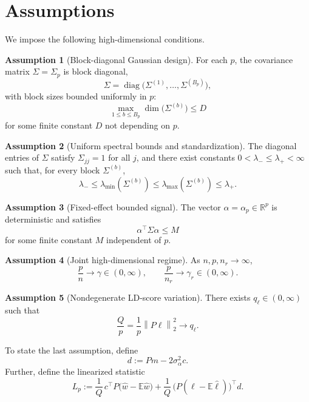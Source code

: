 \documentclass[11pt]{article}
\theoremstyle{definition}
\newtheorem{assumption}{Assumption}
\newcommand{\R}{\mathbb{R}}
\newcommand{\E}{\mathbb{E}}
\newcommand{\diag}{\operatorname{diag}}
\newcommand{\1}{\mathbf{1}}
\newcommand{\norm}[1]{\left\lVert #1 \right\rVert}
\begin{document}
\section*{Assumptions}

We impose the following high-dimensional conditions.

\begin{assumption}[Block-diagonal Gaussian design]\label{ass:block}
For each $p$, the covariance matrix $\Sigma=\Sigma_p$ is block diagonal,
\[
 \Sigma=\diag\bigl(\Sigma^{(1)},\dots,\Sigma^{(B_p)}\bigr),
\]
with block sizes bounded uniformly in $p$:
\[
 \max_{1\le b\le B_p}\dim\bigl(\Sigma^{(b)}\bigr)\le D
\]
for some finite constant $D$ not depending on $p$.
\end{assumption}

\begin{assumption}[Uniform spectral bounds and standardization]\label{ass:spectral}
The diagonal entries of $\Sigma$ satisfy $\Sigma_{jj}=1$ for all $j$, and there exist constants $0<\lambda_-\le \lambda_+<\infty$ such that, for every block $\Sigma^{(b)}$,
\[
 \lambda_-\le \lambda_{\min}(\Sigma^{(b)})\le \lambda_{\max}(\Sigma^{(b)})\le \lambda_+.
\]
\end{assumption}

\begin{assumption}[Fixed-effect bounded signal]\label{ass:alpha}
The vector $\alpha=\alpha_p\in\R^p$ is deterministic and satisfies
\[
 \alpha^\top\Sigma\alpha\le M
\]
for some finite constant $M$ independent of $p$.
\end{assumption}

\begin{assumption}[Joint high-dimensional regime]\label{ass:asymptotics}
As $n,p,n_r\to\infty$,
\[
 \frac{p}{n}\to \gamma\in(0,\infty),
 \qquad
 \frac{p}{n_r}\to \gamma_r\in(0,\infty).
\]
\end{assumption}

\begin{assumption}[Nondegenerate LD-score variation]\label{ass:Q}
There exists $q_\ell\in(0,\infty)$ such that
\[
 \frac{Q}{p}=\frac1p\norm{P\ell}_2^2\longrightarrow q_\ell.
\]
\end{assumption}

To state the last assumption, define
\[
 d:=Pm-2\sigma_\alpha^2 c.
\]
Further, define the linearized statistic
\begin{equation}\label{eq:Lp-def}
 L_p:=\frac1Q\,c^\top P\bigl(\widehat w-\E\widehat w\bigr)
 +\frac1Q\,\bigl(P(\widehat\ell-\E\widehat\ell)\bigr)^\top d.
\end{equation}
\end{document}
